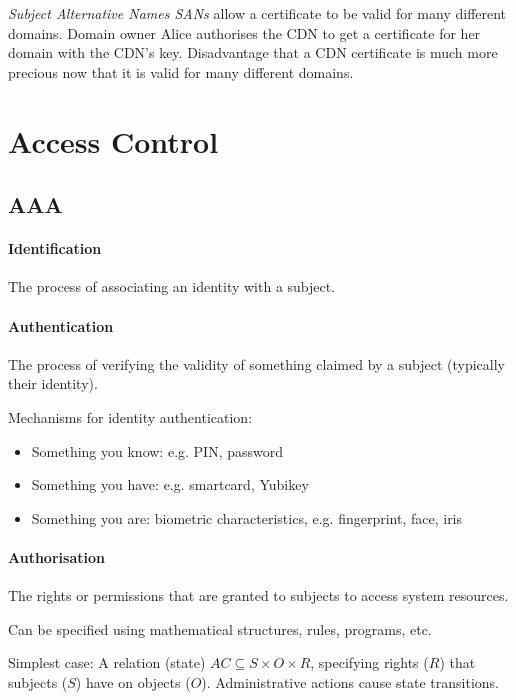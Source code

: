 \emph{Subject Alternative Names SANs} allow a certificate to be valid for many different domains. Domain owner Alice authorises the CDN to get a certificate for her domain with the CDN's key. Disadvantage that a CDN certificate is much more precious now that it is valid for many different domains.


\newpage
\section{Access Control}

\subsection{AAA}

\paragraph{Identification} The process of associating an identity with a subject.

\paragraph{Authentication} The process of verifying the validity of something claimed by a subject (typically their identity).

Mechanisms for identity authentication:
\begin{itemize}
    \item Something you know: e.g. PIN, password
    \item Something you have: e.g. smartcard, Yubikey
    \item Something you are: biometric characteristics, e.g. fingerprint, face, iris
\end{itemize}

\paragraph{Authorisation} The rights or permissions that are granted to subjects to access system resources.

Can be specified using mathematical structures, rules, programs, etc.

Simplest case: A relation (state) $AC \subseteq S \times O \times R$, specifying rights ($R$) that subjects ($S$) have on objects ($O$). Administrative actions cause state transitions. 

